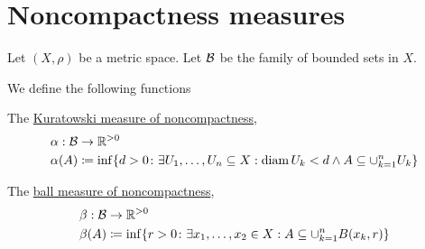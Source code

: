 \section{Noncompactness measures}\label{sec:noncompactness_measures}

Let $(X, \rho)$ be a metric space. Let $\mathcal B$ be the family of bounded sets in $X$.

\begin{definition}\label{def:noncompactness_measures}\cite[definition 7.1]{Deimling1985}
  We define the following functions
  \begin{defenum}
    \item\label{def:noncompactness_measures/sets} The \uline{Kuratowski measure of noncompactness},
    \begin{align*}
      &\alpha: \mathcal B \to \mathbb R^{>0} \\
      &\alpha(A) \coloneqq \inf \{d > 0 \colon \exists U_1, \ldots, U_n \subseteq X: \operatorname{diam} {U_k} < d \land A \subseteq \cup_{k=1}^n U_k \}
    \end{align*}

    \item\label{def:noncompactness_measures/balls} The \uline{ball measure of noncompactness},
    \begin{align*}
      &\beta: \mathcal B \to \mathbb R^{>0} \\
      &\beta(A) \coloneqq \inf \{r > 0 \colon \exists x_1, \ldots, x_2 \in X: A \subseteq \cup_{k=1}^n B(x_k, r) \}
    \end{align*}
  \end{defenum}
\end{definition}

